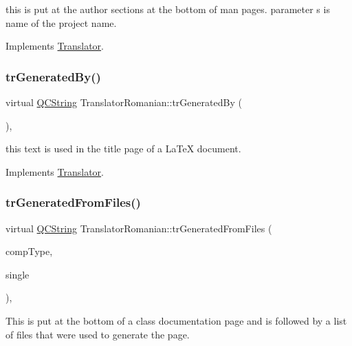 this is put at the author sections at the bottom of man pages. parameter s is name of the project name. 

Implements \mbox{\hyperlink{class_translator}{Translator}}.

\mbox{\label{class_translator_romanian_ad0c3024222995171c927415321198651}} 
\subsubsection{\texorpdfstring{trGeneratedBy()}{trGeneratedBy()}}
{\footnotesize\ttfamily virtual \mbox{\hyperlink{class_q_c_string}{Q\+C\+String}} Translator\+Romanian\+::tr\+Generated\+By (\begin{DoxyParamCaption}{ }\end{DoxyParamCaption})\hspace{0.3cm}{\ttfamily [inline]}, {\ttfamily [virtual]}}

this text is used in the title page of a La\+TeX document. 

Implements \mbox{\hyperlink{class_translator}{Translator}}.

\mbox{\label{class_translator_romanian_a631c6b298a2610d7287c67ca9610c764}} 
\subsubsection{\texorpdfstring{trGeneratedFromFiles()}{trGeneratedFromFiles()}}
{\footnotesize\ttfamily virtual \mbox{\hyperlink{class_q_c_string}{Q\+C\+String}} Translator\+Romanian\+::tr\+Generated\+From\+Files (\begin{DoxyParamCaption}\item[{\mbox{\hyperlink{class_class_def_ae70cf86d35fe954a94c566fbcfc87939}{Class\+Def\+::\+Compound\+Type}}}]{comp\+Type,  }\item[{bool}]{single }\end{DoxyParamCaption})\hspace{0.3cm}{\ttfamily [inline]}, {\ttfamily [virtual]}}

This is put at the bottom of a class documentation page and is followed by a list of files that were used to generate the page. 

